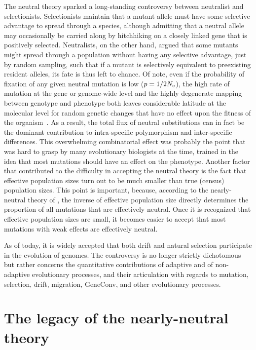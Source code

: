 The neutral theory sparked a long-standing controversy between neutralist and selectionists.
Selectionists maintain that a mutant \gls{allele} must have some selective advantage to spread through a species, although admitting that a \gls{neutral} \gls{allele} may occasionally be carried along by hitchhiking on a closely linked gene that is positively selected.
Neutralists, on the other hand, argued that some mutants might spread through a population without having any selective advantage, just by random sampling, such that if a mutant is selectively equivalent to preexisting resident \glspl{allele}, its fate is thus left to chance.
Of note, even if the probability of fixation of any given neutral mutation is low ($p = 1/2N_{\textrm{e}}$), the high rate of mutation at the gene or genome-wide level and the highly degenerate mapping between genotype and phenotype both leaves considerable latitude at the molecular level for random genetic changes that have no effect upon the fitness of the organism~\citep{King1969}.
As a result, the total flux of neutral substitutions can in fact be the dominant contribution to intra-specific polymorphism and inter-specific differences.
This overwhelming combinatorial effect was probably the point that was hard to grasp by many evolutionary biologists at the time, trained in the idea that most mutations should have an effect on the phenotype.
Another factor that contributed to the difficulty in accepting the neutral theory is the fact that effective population sizes turn out to be much smaller than true (census) population sizes.
This point is important, because, according to the nearly-neutral theory of \citet{Ohta1992}, the inverse of effective population size directly determines the proportion of all mutations that are effectively neutral.
Once it is recognized that effective population sizes are small, it becomes easier to accept that most mutations with weak effects are effectively neutral.

As of today, it is widely accepted that both \gls{drift} and natural selection participate in the evolution of genomes.
The controversy is no longer strictly dichotomous but rather concerns the quantitative contributions of adaptive and of non-adaptive evolutionary processes, and their articulation with regards to mutation, selection, drift, migration, \gls{GeneConv}, and other evolutionary processes.


\section{The legacy of the nearly-neutral theory}
\label{sec:the-legacy-of-the-nearly-neutral-theory}


